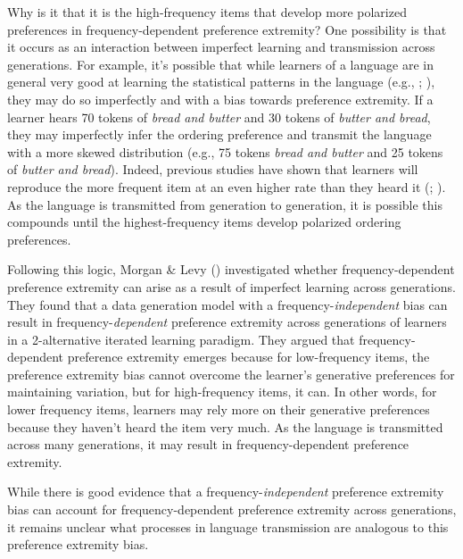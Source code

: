 \documentclass[
  12pt,
  letterpaper,
]{scrreprt}
\begin{document}
Why is it that it is the high-frequency items that develop more
polarized preferences in frequency-dependent preference extremity? One
possibility is that it occurs as an interaction between imperfect
learning and transmission across generations. For example, it's possible
that while learners of a language are in general very good at learning
the statistical patterns in the language (e.g.,
; ), they
may do so imperfectly and with a bias towards preference extremity. If a
learner hears 70 tokens of \emph{bread and butter} and 30 tokens of
\emph{butter and bread}, they may imperfectly infer the ordering
preference and transmit the language with a more skewed distribution
(e.g., 75 tokens \emph{bread and butter} and 25 tokens of
\emph{butter and bread}). Indeed, previous studies have shown that
learners will reproduce the more frequent item at an even higher rate
than they heard it (; ). As the language is transmitted from generation
to generation, it is possible this compounds until the highest-frequency
items develop polarized ordering preferences.

Following this logic, Morgan \& Levy
()
investigated whether frequency-dependent preference extremity can arise
as a result of imperfect learning across generations. They found that a
data generation model with a frequency-\emph{independent} bias can
result in frequency-\emph{dependent} preference extremity across
generations of learners in a 2-alternative iterated learning paradigm.
They argued that frequency-dependent preference extremity emerges
because for low-frequency items, the preference extremity bias cannot
overcome the learner's generative preferences for maintaining variation,
but for high-frequency items, it can. In other words, for lower
frequency items, learners may rely more on their generative preferences
because they haven't heard the item very much. As the language is
transmitted across many generations, it may result in
frequency-dependent preference extremity.

While there is good evidence that a frequency-\emph{independent}
preference extremity bias can account for frequency-dependent preference
extremity across generations, it remains unclear what processes in
language transmission are analogous to this preference extremity bias.
\end{document}
